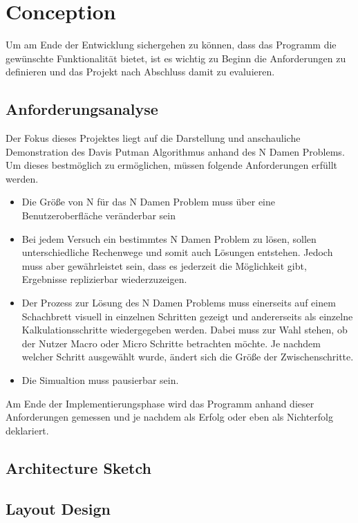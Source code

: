 \chapter{Conception}
Um am Ende der Entwicklung sichergehen zu können, dass das Programm die gewünschte Funktionalität bietet, ist es wichtig zu Beginn die Anforderungen zu definieren und das Projekt nach Abschluss damit zu evaluieren. 
\section{Anforderungsanalyse}
Der Fokus dieses Projektes liegt auf die Darstellung und anschauliche Demonstration des Davis Putman Algorithmus anhand des N Damen Problems. Um dieses bestmöglich zu ermöglichen, müssen folgende Anforderungen erfüllt werden. 
\begin{itemize}
\item Die Größe von N für das N Damen Problem muss über eine Benutzeroberfläche veränderbar sein
\item Bei jedem Versuch ein bestimmtes N Damen Problem zu lösen, sollen unterschiedliche Rechenwege und somit auch Lösungen entstehen. Jedoch muss aber gewährleistet sein, dass es jederzeit die Möglichkeit gibt, Ergebnisse replizierbar wiederzuzeigen. 
\item Der Prozess zur Lösung des N Damen Problems muss einerseits auf einem Schachbrett visuell in einzelnen Schritten gezeigt und andererseits als einzelne Kalkulationsschritte wiedergegeben werden. Dabei muss zur Wahl stehen, ob der Nutzer Macro oder Micro Schritte betrachten möchte. Je nachdem welcher Schritt ausgewählt wurde, ändert sich die Größe der Zwischenschritte.
\item Die Simualtion muss pausierbar sein.
\end{itemize}
Am Ende der Implementierungsphase wird das Programm anhand dieser Anforderungen gemessen und je nachdem als Erfolg oder eben als Nichterfolg deklariert. 

\section{Architecture Sketch}

\section{Layout Design}